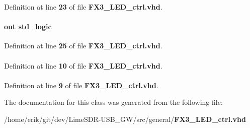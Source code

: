 Definition at line {\bf 23} of file {\bf F\+X3\+\_\+\+L\+E\+D\+\_\+ctrl.\+vhd}.

\paragraph[{led\+\_\+r}]{ {\bfseries \textcolor{keywordflow}{out}\textcolor{vhdlchar}{ }} {\bfseries \textcolor{comment}{std\+\_\+logic}\textcolor{vhdlchar}{ }} \hspace{0.3cm}{\ttfamily [Port]}}\label{classFX3__LED__ctrl_a1256b296b1f35bba67272588ba2f3421}


Definition at line {\bf 25} of file {\bf F\+X3\+\_\+\+L\+E\+D\+\_\+ctrl.\+vhd}.

\paragraph[{numeric\+\_\+std}]{\hspace{0.3cm}{\ttfamily [Package]}}\label{classFX3__LED__ctrl_a2edc34402b573437d5f25fa90ba4013e}


Definition at line {\bf 10} of file {\bf F\+X3\+\_\+\+L\+E\+D\+\_\+ctrl.\+vhd}.

\paragraph[{std\+\_\+logic\+\_\+1164}]{\hspace{0.3cm}{\ttfamily [Package]}}\label{classFX3__LED__ctrl_acd03516902501cd1c7296a98e22c6fcb}


Definition at line {\bf 9} of file {\bf F\+X3\+\_\+\+L\+E\+D\+\_\+ctrl.\+vhd}.



The documentation for this class was generated from the following file\+:\begin{DoxyCompactItemize}
\item 
/home/erik/git/dev/\+Lime\+S\+D\+R-\/\+U\+S\+B\+\_\+\+G\+W/src/general/{\bf F\+X3\+\_\+\+L\+E\+D\+\_\+ctrl.\+vhd}\end{DoxyCompactItemize}

